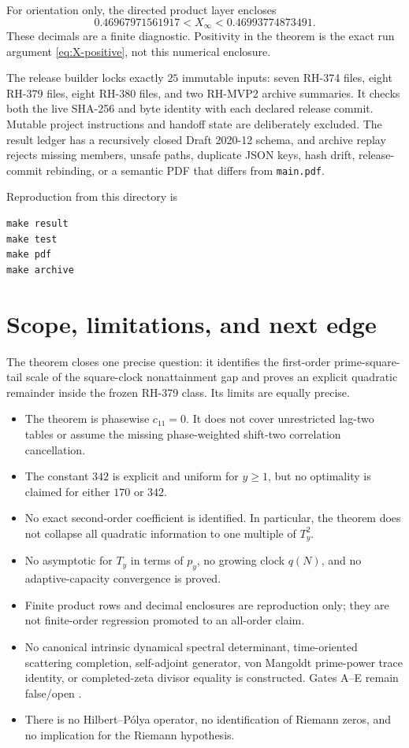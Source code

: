 \documentclass[11pt]{article}
\theoremstyle{definition}
\theoremstyle{remark}
\begin{document}
For orientation only, the directed product layer encloses
\[
 0.46967971561917<X_\infty<0.46993774873491.
\]
These decimals are a finite diagnostic.  Positivity in the theorem is the
exact run argument \eqref{eq:X-positive}, not this numerical enclosure.

The release builder locks exactly $25$ immutable inputs: seven RH-374
files, eight RH-379 files, eight RH-380 files, and two RH-MVP2 archive
summaries.  It checks both the live SHA-256 and byte identity with each
declared release commit.  Mutable project instructions and handoff state
are deliberately excluded.  The result ledger has a recursively closed
Draft 2020-12 schema, and archive replay rejects missing members, unsafe
paths, duplicate JSON keys, hash drift, release-commit rebinding, or a
semantic PDF that differs from \texttt{main.pdf}.

Reproduction from this directory is
\begin{verbatim}
make result
make test
make pdf
make archive
\end{verbatim}

\section{Scope, limitations, and next edge}

The theorem closes one precise question: it identifies the first-order
prime-square-tail scale of the square-clock nonattainment gap and proves an
explicit quadratic remainder inside the frozen RH-379 class.  Its limits
are equally precise.

\begin{itemize}[leftmargin=2em]
\item The theorem is phasewise $c_{11}=0$.  It does not cover unrestricted
      lag-two tables or assume the missing phase-weighted shift-two
      correlation cancellation.
\item The constant $342$ is explicit and uniform for $y\ge1$, but no
      optimality is claimed for either $170$ or $342$.
\item No exact second-order coefficient is identified.  In particular,
      the theorem does not collapse all quadratic information to one
      multiple of $T_y^2$.
\item No asymptotic for $T_y$ in terms of $p_y$, no growing clock $q(N)$,
      and no adaptive-capacity convergence is proved.
\item Finite product rows and decimal enclosures are reproduction only;
      they are not finite-order regression promoted to an all-order claim.
\item No canonical intrinsic dynamical spectral determinant,
      time-oriented scattering completion, self-adjoint generator,
      von Mangoldt prime-power trace identity, or completed-zeta divisor
      equality is constructed.  Gates A--E remain false/open
      \cite{RHMVP2}.
\item There is no Hilbert--P\'olya operator, no identification of Riemann
      zeros, and no implication for the Riemann hypothesis.
\end{itemize}
\end{document}
